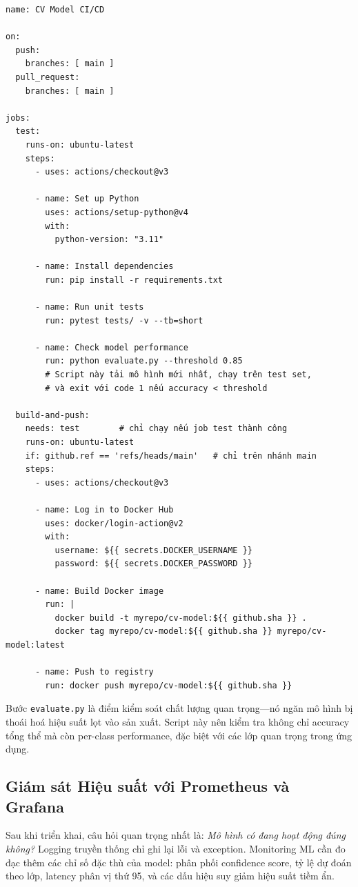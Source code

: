 \begin{verbatim}
name: CV Model CI/CD

on:
  push:
    branches: [ main ]
  pull_request:
    branches: [ main ]

jobs:
  test:
    runs-on: ubuntu-latest
    steps:
      - uses: actions/checkout@v3

      - name: Set up Python
        uses: actions/setup-python@v4
        with:
          python-version: "3.11"

      - name: Install dependencies
        run: pip install -r requirements.txt

      - name: Run unit tests
        run: pytest tests/ -v --tb=short

      - name: Check model performance
        run: python evaluate.py --threshold 0.85
        # Script này tải mô hình mới nhất, chạy trên test set,
        # và exit với code 1 nếu accuracy < threshold

  build-and-push:
    needs: test        # chỉ chạy nếu job test thành công
    runs-on: ubuntu-latest
    if: github.ref == 'refs/heads/main'   # chỉ trên nhánh main
    steps:
      - uses: actions/checkout@v3

      - name: Log in to Docker Hub
        uses: docker/login-action@v2
        with:
          username: ${{ secrets.DOCKER_USERNAME }}
          password: ${{ secrets.DOCKER_PASSWORD }}

      - name: Build Docker image
        run: |
          docker build -t myrepo/cv-model:${{ github.sha }} .
          docker tag myrepo/cv-model:${{ github.sha }} myrepo/cv-model:latest

      - name: Push to registry
        run: docker push myrepo/cv-model:${{ github.sha }}
\end{verbatim}

Bước \texttt{evaluate.py} là điểm kiểm soát chất lượng quan trọng---nó ngăn mô hình bị thoái hoá hiệu suất lọt vào sản xuất. Script này nên kiểm tra không chỉ accuracy tổng thể mà còn per-class performance, đặc biệt với các lớp quan trọng trong ứng dụng.

\subsection*{Giám sát Hiệu suất với Prometheus và Grafana}

Sau khi triển khai, câu hỏi quan trọng nhất là: \textit{Mô hình có đang hoạt động đúng không?} Logging truyền thống chỉ ghi lại lỗi và exception. Monitoring ML cần đo đạc thêm các chỉ số đặc thù của model: phân phối confidence score, tỷ lệ dự đoán theo lớp, latency phân vị thứ 95, và các dấu hiệu suy giảm hiệu suất tiềm ẩn.

